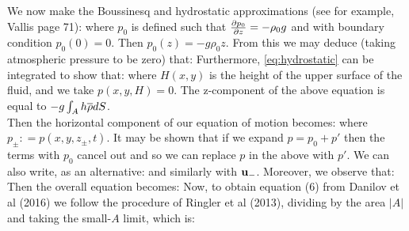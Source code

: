 \documentclass[10pt]{article}
\begin{document}
We now make the Boussinesq and hydrostatic approximations (see for example, Vallis page 71):
where $p_{0}$ is defined such that $\frac{\partial p_{0}}{\partial z} = -\rho_{0}g$ and with boundary condition $p_{0}(0) = 0$. Then $p_{0}(z) = -g\rho_{0}z$. From this we may deduce (taking atmospheric pressure to be zero) that:
Furthermore, \cref{eq:hydrostatic} can be integrated to show that:
where $H(x,y)$ is the height of the upper surface of the fluid, and we take $p(x,y,H) = 0$. The z-component of the above equation is equal to $-g\int_{A} h\overline{\rho} dS$.\\
 Then the horizontal component of our equation of motion becomes:
where $p_{\pm} : = p(x,y,z_{\pm},t)$. It may be shown that if we expand $p = p_{0} + p'$ then the terms with $p_{0}$ cancel out and so we can replace $p$ in the above with $p'$. We can also write, as an alternative:
	and similarly with $\mathbf{u}_{-}$. Moreover, we observe that:
	Then the overall equation becomes:
Now, to obtain equation (6) from Danilov et al (2016) we follow the procedure of Ringler et al (2013), dividing by the area $|A|$ and taking the small-$A$ limit, which is:
\end{document}
